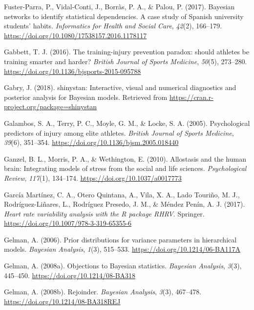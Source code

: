\documentclass[man,floatsintext]{apa6}
\begin{document}
\leavevmode\hypertarget{ref-Fuster-Parra2017}{}%
Fuster-Parra, P., Vidal-Conti, J., Borràs, P. A., \& Palou, P. (2017). Bayesian networks to identify statistical dependencies. A case study of Spanish university students' habits. \emph{Informatics for Health and Social Care}, \emph{42}(2), 166--179. \url{https://doi.org/10.1080/17538157.2016.1178117}

\leavevmode\hypertarget{ref-Gabbett2016}{}%
Gabbett, T. J. (2016). The training-injury prevention paradox: should athletes be training smarter and harder? \emph{British Journal of Sports Medicine}, \emph{50}(5), 273--280. \url{https://doi.org/10.1136/bjsports-2015-095788}

\leavevmode\hypertarget{ref-Gabry2018}{}%
Gabry, J. (2018). shinystan: Interactive, visual and numerical diagnostics and posterior analysis for Bayesian models. Retrieved from \url{https://cran.r-project.org/package=shinystan}

\leavevmode\hypertarget{ref-Galambos2005}{}%
Galambos, S. A., Terry, P. C., Moyle, G. M., \& Locke, S. A. (2005). Psychological predictors of injury among elite athletes. \emph{British Journal of Sports Medicine}, \emph{39}(6), 351--354. \url{https://doi.org/10.1136/bjsm.2005.018440}

\leavevmode\hypertarget{ref-Ganzel2010}{}%
Ganzel, B. L., Morris, P. A., \& Wethington, E. (2010). Allostasis and the human brain: Integrating models of stress from the social and life sciences. \emph{Psychological Review}, \emph{117}(1), 134--174. \url{https://doi.org/10.1037/a0017773}

\leavevmode\hypertarget{ref-GarciaMartinez2017}{}%
García Martínez, C. A., Otero Quintana, A., Vila, X. A., Lado Touriño, M. J., Rodríguez-Liñares, L., Rodríguez Presedo, J. M., \& Méndez Penín, A. J. (2017). \emph{Heart rate variability analysis with the R package RHRV}. Springer. \url{https://doi.org/10.1007/978-3-319-65355-6}

\leavevmode\hypertarget{ref-Gelman2006a}{}%
Gelman, A. (2006). Prior distributions for variance parameters in hierarchical models. \emph{Bayesian Analysis}, \emph{1}(3), 515--533. \url{https://doi.org/10.1214/06-BA117A}

\leavevmode\hypertarget{ref-Gelman2008a}{}%
Gelman, A. (2008a). Objections to Bayesian statistics. \emph{Bayesian Analysis}, \emph{3}(3), 445--450. \url{https://doi.org/10.1214/08-BA318}

\leavevmode\hypertarget{ref-Gelman2008}{}%
Gelman, A. (2008b). Rejoinder. \emph{Bayesian Analysis}, \emph{3}(3), 467--478. \url{https://doi.org/10.1214/08-BA318REJ}
\end{document}
